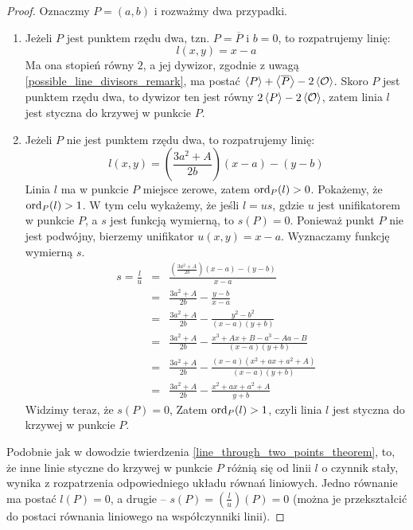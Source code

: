 \begin{proof}
Oznaczmy $P = (a, b)$ i rozważmy dwa przypadki.
\begin{enumerate}
\item
Jeżeli $P$ jest punktem rzędu dwa, tzn. $P = \overline{P}$ i $b = 0$,
to rozpatrujemy linię:
\begin{equation}
l(x, y) = x - a
\end{equation}
Ma ona stopień równy $2$,
a jej dywizor, zgodnie z uwagą \ref{possible_line_divisors_remark},
ma postać $\left\langle P\right\rangle + \left\langle\overline{P}\right\rangle - 2\left\langle\mathcal{O}\right\rangle$.
Skoro $P$ jest punktem rzędu dwa, to dywizor ten jest równy
$2\left\langle P\right\rangle - 2\left\langle\mathcal{O}\right\rangle$,
zatem linia $l$ jest styczna do krzywej w punkcie $P$.
\item
Jeżeli $P$ nie jest punktem rzędu dwa,
to rozpatrujemy linię:
\begin{equation}
l(x, y) = \left(\frac{3a^2 + A}{2b}\right)(x - a) - (y - b)
\end{equation}
Linia $l$ ma w punkcie $P$ miejsce zerowe, zatem $\operatorname{ord}_P(l) > 0$.
Pokażemy, że $\operatorname{ord}_P(l) > 1$.
W tym celu wykażemy, że jeśli $l = us$,
gdzie $u$ jest unifikatorem w punkcie $P$,
a $s$ jest funkcją wymierną,
to $s(P) = 0$.
Ponieważ punkt $P$ nie jest podwójny,
bierzemy unifikator $u(x, y) = x - a$.
Wyznaczamy funkcję wymierną $s$.
\begin{eqnarray*}
s = \frac{l}{u}
& = & \frac{\left(\frac{3a^2+A}{2b}\right)(x-a) - (y-b)}{x-a} \\
& = & \frac{3a^2+A}{2b} - \frac{y-b}{x-a} \\
& = & \frac{3a^2+A}{2b} - \frac{y^2-b^2}{(x-a)(y+b)} \\
& = & \frac{3a^2+A}{2b} - \frac{x^3+Ax+B - a^3-Aa-B}{(x-a)(y+b)} \\
& = & \frac{3a^2+A}{2b} - \frac{(x-a)(x^2+ax+a^2+A)}{(x-a)(y+b)} \\
& = & \frac{3a^2+A}{2b} - \frac{x^2+ax+a^2+A}{y+b}
\end{eqnarray*}
Widzimy teraz, że $s(P) = 0$,
Zatem $\operatorname{ord}_P(l) > 1$, czyli linia $l$ jest styczna do krzywej w punkcie $P$.
\end{enumerate}

Podobnie jak w dowodzie twierdzenia \ref{line_through_two_points_theorem},
to, że inne linie styczne do krzywej w punkcie $P$ różnią się od linii $l$
o czynnik stały, wynika z rozpatrzenia odpowiedniego układu równań liniowych.
Jedno równanie ma postać $l(P) = 0$, a drugie --
$s(P) = (\frac{l}{u})(P) = 0$
(można je przekształcić do postaci równania liniowego na współczynniki linii).
\end{proof}

